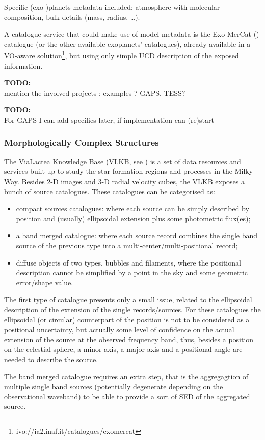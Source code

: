 \documentclass[11pt,a4paper]{ivoa}
\newcommand{\TODO}[1]{%
    \noindent%
    \colorbox{todocolor}{%
            \parbox{0.85\linewidth}{\sffamily \textbf{TODO:}\\
            #1}
    }%
    \vspace{2pt}

}
\begin{document}
Specific (exo-)planets metadata included: atmosphere with molecular
composition, bulk details (mass, radius, \ldots).

A catalogue service that could make use of model metadata is the
Exo-MerCat (\cite{2020A&C....3100370A}) catalogue (or the other available exoplanets'
catalogues), already available in a VO-aware 
solution\footnote{ivo://ia2.inaf.it/catalogues/exomercat}, but using only
simple UCD description of the exposed information.

\TODO{mention the involved projects : examples ? GAPS, TESS? }
\TODO{For GAPS I can add specifics later, if implementation can
(re)start}

\subsubsection{Morphologically Complex Structures}
The ViaLactea Knowledge Base (VLKB, see \cite{2016SPIE.9913E..0HM}) is a set of data
resources and services built up to study the star formation regions and
processes in the Milky Way. Besides 2-D images and 3-D radial velocity
cubes, the VLKB exposes a bunch of source catalogues. These catalogues
can be categorised as:

\begin{itemize}
	\item compact sources catalogues: where each source can be simply
described by position and (usually) ellipsoidal extension plus some
photometric flux(es);
	\item a band merged catalogue: where each source record combines the
single band source of the previous type into a
multi-center/multi-positional record;
	\item diffuse objects of two types, bubbles and filaments, where the
positional description cannot be simplified by a point in the sky and
some geometric error/shape value.
\end{itemize} 

The first type of catalogue presents only a small issue, related to the
ellipsoidal description of the extension of the single records/sources.
For these catalogues the ellipsoidal (or circular) counterpart of the position is not
to be considered as a positional uncertainty, but actually some level of
confidence on the actual extension of the source at the observed
frequency band, thus, besides a position on the celestial sphere, a minor axis, 
a major axis and a positional angle are needed to describe the source.

The band merged catalogue requires an extra step, that is the
aggregagtion of multiple single band sources (potentially degenerate
depending on the observational waveband) to be able to provide a sort
of SED of the aggregated source.
\end{document}
